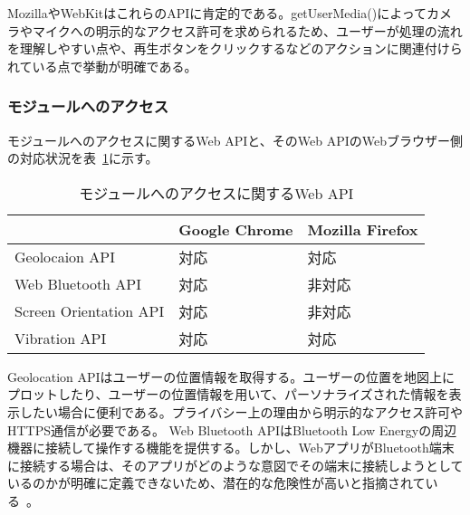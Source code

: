 MozillaやWebKitはこれらのAPIに肯定的である。getUserMedia()によってカメラやマイクへの明示的なアクセス許可を求められるため、ユーザーが処理の流れを理解しやすい点や、再生ボタンをクリックするなどのアクションに関連付けられている点で挙動が明確である。
\subsubsection{モジュールへのアクセス}\label{subsubsection:モジュールへのアクセス}
モジュールへのアクセスに関するWeb APIと、そのWeb APIのWebブラウザー側の対応状況を表~\ref{table:モジュールへのアクセスに関するWeb API}に示す。
\begin{table}
  \centering
  \begin{tabular}{|p{20em}|p{10em}|p{10em}|}
    \hline
    & Google Chrome & Mozilla Firefox \\ \hline
    Geolocaion API & 対応 & 対応 \\ \hline
    Web Bluetooth API & 対応 & 非対応 \\ \hline
    Screen Orientation API & 対応 & 非対応 \\ \hline
    Vibration API & 対応 & 対応 \\ \hline
  \end{tabular}
  \caption{モジュールへのアクセスに関するWeb API}\label{table:モジュールへのアクセスに関するWeb API}
\end{table}
Geolocation APIはユーザーの位置情報を取得する。ユーザーの位置を地図上にプロットしたり、ユーザーの位置情報を用いて、パーソナライズされた情報を表示したい場合に便利である。プライバシー上の理由から明示的なアクセス許可やHTTPS通信が必要である。
Web Bluetooth APIはBluetooth Low Energyの周辺機器に接続して操作する機能を提供する。しかし、WebアプリがBluetooth端末に接続する場合は、そのアプリがどのような意図でその端末に接続しようとしているのかが明確に定義できないため、潜在的な危険性が高いと指摘されている~\cite{MozillaWebBluetooth}。
